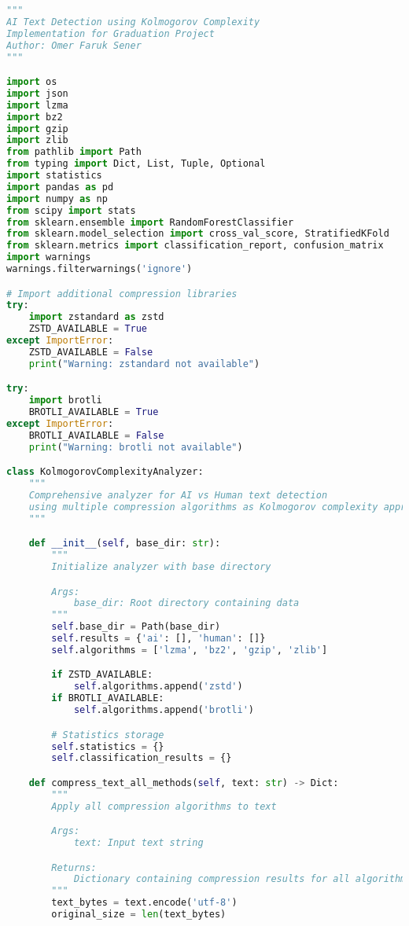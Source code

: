\documentclass[12pt,a4paper]{report}
\begin{document}
\begin{lstlisting}[language=Python, caption=Complete Compression Analysis Framework]
"""
AI Text Detection using Kolmogorov Complexity
Implementation for Graduation Project
Author: Omer Faruk Sener
"""

import os
import json
import lzma
import bz2
import gzip
import zlib
from pathlib import Path
from typing import Dict, List, Tuple, Optional
import statistics
import pandas as pd
import numpy as np
from scipy import stats
from sklearn.ensemble import RandomForestClassifier
from sklearn.model_selection import cross_val_score, StratifiedKFold
from sklearn.metrics import classification_report, confusion_matrix
import warnings
warnings.filterwarnings('ignore')

# Import additional compression libraries
try:
    import zstandard as zstd
    ZSTD_AVAILABLE = True
except ImportError:
    ZSTD_AVAILABLE = False
    print("Warning: zstandard not available")

try:
    import brotli
    BROTLI_AVAILABLE = True
except ImportError:
    BROTLI_AVAILABLE = False
    print("Warning: brotli not available")

class KolmogorovComplexityAnalyzer:
    """
    Comprehensive analyzer for AI vs Human text detection
    using multiple compression algorithms as Kolmogorov complexity approximations
    """

    def __init__(self, base_dir: str):
        """
        Initialize analyzer with base directory

        Args:
            base_dir: Root directory containing data
        """
        self.base_dir = Path(base_dir)
        self.results = {'ai': [], 'human': []}
        self.algorithms = ['lzma', 'bz2', 'gzip', 'zlib']

        if ZSTD_AVAILABLE:
            self.algorithms.append('zstd')
        if BROTLI_AVAILABLE:
            self.algorithms.append('brotli')

        # Statistics storage
        self.statistics = {}
        self.classification_results = {}

    def compress_text_all_methods(self, text: str) -> Dict:
        """
        Apply all compression algorithms to text

        Args:
            text: Input text string

        Returns:
            Dictionary containing compression results for all algorithms
        """
        text_bytes = text.encode('utf-8')
        original_size = len(text_bytes)


\end{lstlisting}
\end{document}
